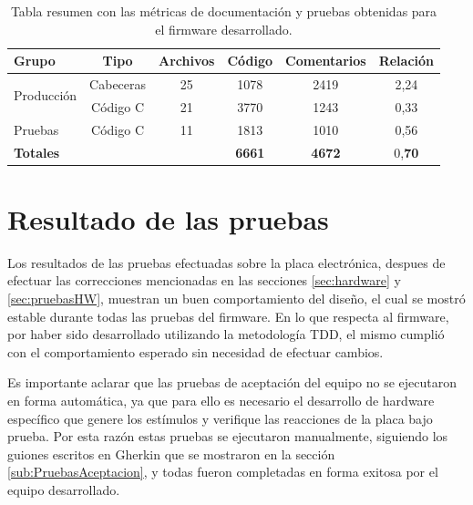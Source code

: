 \begin{table}[h]
	\centering
	\caption[Metricas de documentación y pruebas]{Tabla resumen con las métricas de documentación y pruebas obtenidas para el firmware desarrollado.}
	\begin{tabular}{l c c c c c }
		\toprule
		\textbf{Grupo} &
		\textbf{Tipo} &
		\textbf{Archivos} &
		\textbf{Código} &
		\textbf{Comentarios} &
		\textbf{Relación} \\
		\midrule
		\multirow[c]{2}{*}{Producción}
				& Cabeceras & 25 & 1078 & 2419 & 2,24 \\
				& Código C 	& 21 & 3770 & 1243 & 0,33 \\
		Pruebas & Código C 	& 11 & 1813 & 1010 & 0,56 \\
		\textbf{Totales} &		    & 	 & \textbf{6661} & \textbf{4672} & 0,\textbf{70}  \\
		\bottomrule
		\hline
	\end{tabular}
	\label{tab:MetricasFirmware}
\end{table}

\section{Resultado de las pruebas}
\label{sec:PruebasFirmware}

Los resultados de las pruebas efectuadas sobre la placa electrónica, despues de efectuar las correcciones mencionadas en las secciones \ref{sec:hardware} y \ref{sec:pruebasHW}, muestran un buen comportamiento del diseño, el cual se mostró estable durante todas las pruebas del firmware. En lo que respecta al firmware, por haber sido desarrollado utilizando la metodología TDD, el mismo cumplió con el comportamiento esperado sin necesidad de efectuar cambios. 

Es importante aclarar que las pruebas de aceptación del equipo no se ejecutaron en forma automática, ya que para ello es necesario el desarrollo de hardware específico que genere los estímulos y verifique las reacciones de la placa bajo prueba. Por esta razón estas pruebas se ejecutaron manualmente, siguiendo los guiones escritos en Gherkin que se mostraron en la sección \ref{sub:PruebasAceptacion}, y todas fueron completadas en forma exitosa por el equipo desarrollado. 





